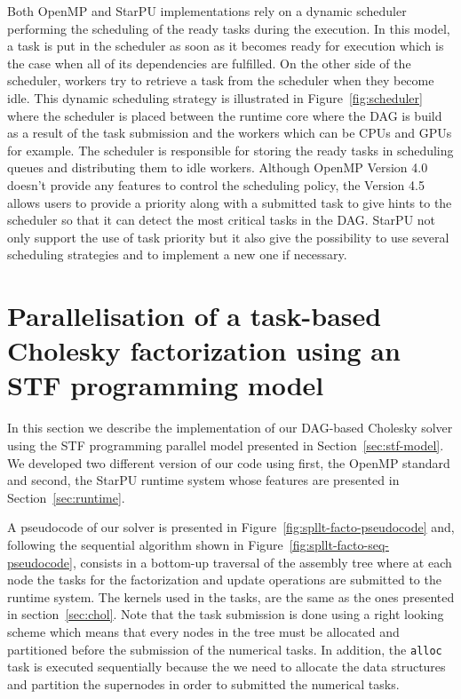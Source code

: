\documentclass{article}
\newcommand{\starpu}{{StarPU}\xspace}
\newcommand{\openmp}{OpenMP\xspace}
\begin{document}
Both \openmp and \starpu implementations rely on a dynamic scheduler
performing the scheduling of the ready tasks during the execution. In
this model, a task is put in the scheduler as soon as it becomes ready
for execution which is the case when all of its dependencies are
fulfilled. On the other side of the scheduler, workers try to retrieve
a task from the scheduler when they become idle. This dynamic
scheduling strategy is illustrated in Figure~\ref{fig:scheduler} where
the scheduler is placed between the runtime core where the DAG is
build as a result of the task submission and the workers which can be
CPUs and GPUs for example. The scheduler is responsible for storing
the ready tasks in scheduling queues and distributing them to idle
workers. Although \openmp Version 4.0 doesn't provide any features to
control the scheduling policy, the Version 4.5 allows users to provide
a priority along with a submitted task to give hints to the scheduler
so that it can detect the most critical tasks in the DAG. \starpu not
only support the use of task priority but it also give the possibility
to use several scheduling strategies and to implement a new one if
necessary.

\section{Parallelisation of a task-based Cholesky factorization using an STF programming model}
\label{sec:spllt-stf}



In this section we describe the implementation of our DAG-based
Cholesky solver using the STF programming parallel model presented in
Section~\ref{sec:stf-model}. We developed two different version of our
code using first, the OpenMP standard and second, the StarPU runtime
system whose features are presented in Section~\ref{sec:runtime}.

A pseudocode of our solver is presented in
Figure~\ref{fig:spllt-facto-pseudocode} and, following the sequential
algorithm shown in Figure~\ref{fig:spllt-facto-seq-pseudocode},
consists in a bottom-up traversal of the assembly tree where at each
node the tasks for the factorization and update operations are
submitted to the runtime system. The kernels used in the tasks, are
the same as the ones presented in section~\ref{sec:chol}. Note that
the task submission is done using a right looking scheme which means
that every nodes in the tree must be allocated and partitioned before
the submission of the numerical tasks. In addition, the \texttt{alloc}
task is executed sequentially because the we need to allocate the data
structures and partition the supernodes in order to submitted the
numerical tasks.
\end{document}
